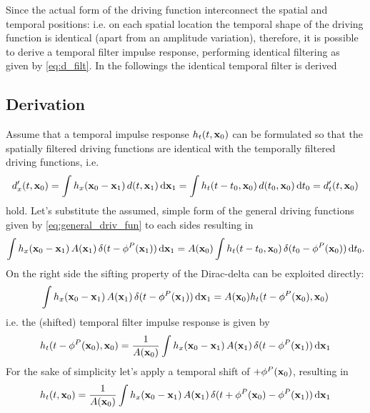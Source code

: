 \documentclass[12pt,a4paper]{article}
\begin{document}
Since the actual form of the driving function interconnect the spatial and temporal positions: i.e. on each spatial location the temporal shape of the driving function is identical (apart from an amplitude variation), therefore, it is possible to derive a temporal filter impulse response, performing identical filtering as given by \eqref{eq:d_filt}.
In the followings the identical temporal filter is derived

\subsection{Derivation}
Assume that a temporal impulse response $h_t(t,\mathbf{x}_0)$ can be formulated so that the spatially filtered driving functions are identical with the temporally filtered driving functions, i.e. 
\begin{equation}
    d'_x(t,\mathbf{x}_0)  = \int h_x(\mathbf{x}_0 - \mathbf{x}_1) \, d(t, \mathbf{x}_1) \, \mathrm{d} \mathbf{x}_1 = \int h_t(t - t_0,\mathbf{x}_0) \, d(t_0, \mathbf{x}_0) \, \mathrm{d} t_0  = d'_t(t,\mathbf{x}_0) 
\end{equation}
hold.
Let's substitute the assumed, simple form of the general driving functions given by \eqref{eq:general_driv_fun} to each sides resulting in
\begin{equation}
    \int h_x(\mathbf{x}_0 - \mathbf{x}_1) \, 
    A(\mathbf{x}_1) \, \delta( t-  \phi^P(\mathbf{x}_1) )
    \, \mathrm{d} \mathbf{x}_1 =  A(\mathbf{x}_0)  \int h_t(t - t_0,\mathbf{x}_0)
    \, \delta( t_0 - \phi^P(\mathbf{x}_0) ) \, \mathrm{d} t_0.
\end{equation}
On the right side the sifting property of the Dirac-delta can be exploited directly:
\begin{equation}
    \int h_x(\mathbf{x}_0 - \mathbf{x}_1) \, 
    A(\mathbf{x}_1) \, \delta( t-  \phi^P(\mathbf{x}_1) )
    \, \mathrm{d} \mathbf{x}_1 = A(\mathbf{x}_0)  h_t(t - \phi^P(\mathbf{x}_0) , \mathbf{x}_0) 
\end{equation}
i.e. the (shifted) temporal filter impulse response is given by
\begin{equation}
    h_t(t -  \phi^P(\mathbf{x}_0) , \mathbf{x}_0)  = \frac{1}{ A(\mathbf{x}_0) }
    \int h_x(\mathbf{x}_0 - \mathbf{x}_1) \, 
    A(\mathbf{x}_1) \, \delta( t-  \phi^P(\mathbf{x}_1) )
    \, \mathrm{d} \mathbf{x}_1 
\end{equation}
For the sake of simplicity let's apply a temporal shift of $+\phi^P(\mathbf{x}_0)$, resulting in
\begin{equation}
    h_t(t, \mathbf{x}_0)  = \frac{1}{ A(\mathbf{x}_0) }
    \int h_x(\mathbf{x}_0 - \mathbf{x}_1) \, 
    A(\mathbf{x}_1) \, \delta( t + \phi^P(\mathbf{x}_0)- \phi^P(\mathbf{x}_1) )
    \, \mathrm{d} \mathbf{x}_1 
\end{equation}
\end{document}
